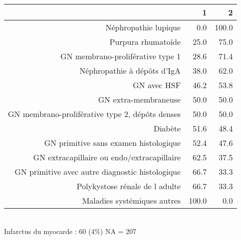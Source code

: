 \documentclass[11pt,a4paper]{article}\usepackage[]{graphicx}\usepackage[]{color}
\begin{document}
\begin{table}[H]
\centering
\begin{tabular}{rrr}
  \hline
 & 1 & 2 \\ 
  \hline
Néphropathie lupique & 0.0 & 100.0 \\ 
  Purpura rhumatoïde & 25.0 & 75.0 \\ 
  GN membrano-proliférative type 1 & 28.6 & 71.4 \\ 
  Néphropathie à dépôts d'IgA & 38.0 & 62.0 \\ 
  GN avec HSF & 46.2 & 53.8 \\ 
  GN extra-membraneuse & 50.0 & 50.0 \\ 
  GN membrano-proliférative type 2, dépôts denses & 50.0 & 50.0 \\ 
  Diabète & 51.6 & 48.4 \\ 
  GN primitive sans examen histologique & 52.4 & 47.6 \\ 
  GN extracapillaire ou endo/extracapillaire & 62.5 & 37.5 \\ 
  GN primitive avec autre diagnostic histologique & 66.7 & 33.3 \\ 
  Polykystose rénale de l adulte & 66.7 & 33.3 \\ 
  Maladies systémiques autres & 100.0 & 0.0 \\ 
   \hline
\end{tabular}
\end{table}

~\\

Infarctus du myocarde : 60 (4\%) NA = 207
\end{document}
